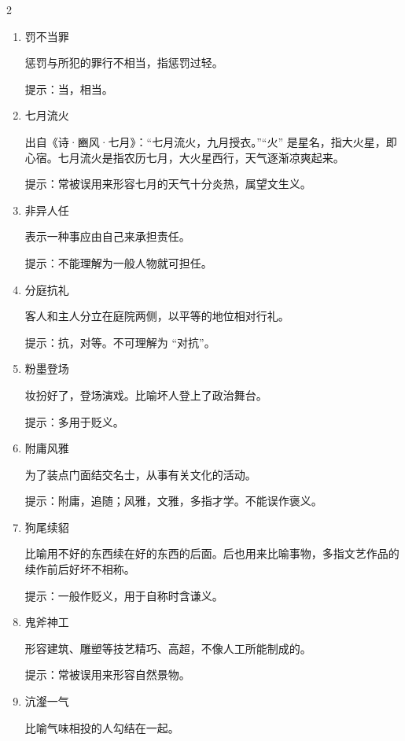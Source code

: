 \documentclass[final,oneside]{ctexbook}
\begin{document}
\begin{multicols}{2}
\begin{enumerate}
      炫耀自己的功劳，夸耀自己的才能。

      提示：伐，夸耀。不可理解为 “讨伐”。

    \item 罚不当罪

      惩罚与所犯的罪行不相当，指惩罚过轻。

      提示：当，相当。

    \item 七月流火

      出自《诗·豳风·七月》：“七月流火，九月授衣。”“火” 是星名，指大火星，即心宿。七月流火是指农历七月，大火星西行，天气逐渐凉爽起来。

      提示：常被误用来形容七月的天气十分炎热，属望文生义。

    \item 非异人任

      表示一种事应由自己来承担责任。

      提示：不能理解为一般人物就可担任。

    \item 分庭抗礼

      客人和主人分立在庭院两侧，以平等的地位相对行礼。

      提示：抗，对等。不可理解为 “对抗”。

    \item 粉墨登场

      妆扮好了，登场演戏。比喻坏人登上了政治舞台。

      提示：多用于贬义。

    \item 附庸风雅

      为了装点门面结交名士，从事有关文化的活动。

      提示：附庸，追随；风雅，文雅，多指才学。不能误作褒义。

    \item 狗尾续貂

      比喻用不好的东西续在好的东西的后面。后也用来比喻事物，多指文艺作品的续作前后好坏不相称。

      提示：一般作贬义，用于自称时含谦义。

    \item 鬼斧神工

      形容建筑、雕塑等技艺精巧、高超，不像人工所能制成的。

      提示：常被误用来形容自然景物。

    \item 沆瀣一气

      比喻气味相投的人勾结在一起。


\end{enumerate}
\end{multicols}
\end{document}
